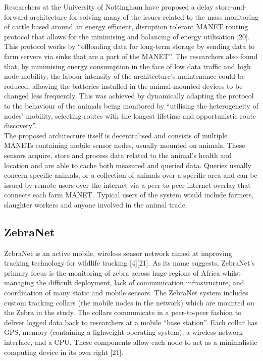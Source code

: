 \documentclass{article}
\begin{document}
\noindent Researchers at the University of Nottingham have proposed a delay store-and-forward architecture for solving many of the issues related to the mass monitoring of cattle based around an energy efficient, disruption tolerant MANET routing protocol that allows for the minimising and balancing of energy utilisation [20]. This protocol works by ``offloading data for long-term storage by sending data to farm servers via sinks that are a part of the MANET''. The researchers also found that, by minimising energy consumption in the face of low data traffic and high node mobility, the labour intensity of the architecture's maintenance could be reduced, allowing the batteries installed in the animal-mounted devices to be changed less frequently. This was achieved by dynamically adapting the protocol to the behaviour of the animals being monitored by ``utilising the heterogeneity of nodes' mobility, selecting routes with the longest lifetime and opportunistic route discovery''.\\

\noindent The proposed architecture itself is decentralised and consists of multiple MANETs containing mobile sensor nodes, usually mounted on animals. These sensors acquire, store and process data related to the animal's health and location and are able to cache both measured and queried data. Queries usually concern specific animals, or a collection of animals over a specific area and can be issued by remote users over the internet via a peer-to-peer internet overlay that connects each farm MANET. Typical users of the system would include farmers, slaughter workers and anyone involved in the animal trade.

\subsection{ZebraNet}

ZebraNet is an active mobile, wireless sensor network aimed at improving tracking 
technology for wildlife tracking [4][21]. As its name suggests, ZebraNet's primary focus is the monitoring of zebra across huge regions of Africa whilst managing the difficult deployment, lack of communication infrastructure, and coordination of many static and mobile sensors. The ZebraNet system includes custom tracking collars (the mobile nodes in the network) which are mounted on the Zebra in the study. The collars communicate in a peer-to-peer fashion to deliver logged data back to researchers at a mobile ``base station''. Each collar has GPS, memory (containing a lighweight operating system), a wireless network interface, and a CPU. These components allow each node to act as a minimalistic computing device in its own right [21].\\
\end{document}
